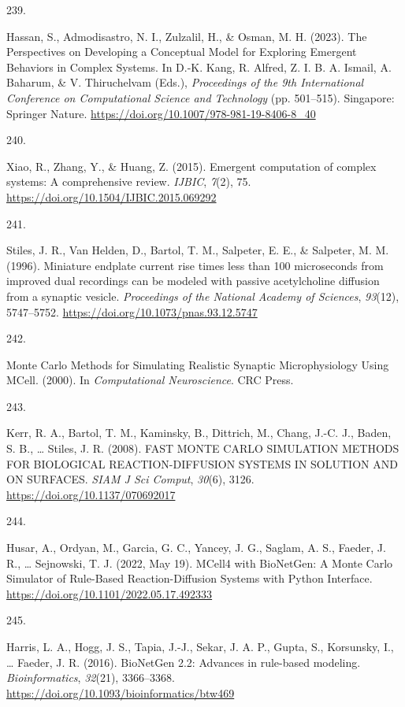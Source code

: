 \documentclass[
  11pt,
  letterpaper,
]{scrreprt}
\newlength{\cslhangindent}
\newlength{\csllabelwidth}
\newenvironment{CSLReferences}[2] %
 {\begin{list}{}{%
  \setlength{\itemindent}{0pt}
  \setlength{\leftmargin}{0pt}
  \setlength{\parsep}{0pt}
  \ifodd #1
   \setlength{\leftmargin}{\cslhangindent}
   \setlength{\itemindent}{-1\cslhangindent}
  \fi
  \setlength{\itemsep}{#2\baselineskip}}}
 {\end{list}}
\newcommand{\CSLLeftMargin}[1]{\parbox[t]{\csllabelwidth}{\strut#1\strut}}
\newcommand{\CSLRightInline}[1]{\parbox[t]{\linewidth - \csllabelwidth}{\strut#1\strut}}
\begin{document}
\begin{CSLReferences}{0}{0}
\CSLLeftMargin{239. }%
\CSLRightInline{Hassan, S., Admodisastro, N. I., Zulzalil, H., \& Osman,
M. H. (2023). The {Perspectives} on {Developing} a {Conceptual Model}
for {Exploring Emergent Behaviors} in {Complex Systems}. In D.-K. Kang,
R. Alfred, Z. I. B. A. Ismail, A. Baharum, \& V. Thiruchelvam (Eds.),
\emph{Proceedings of the 9th {International Conference} on
{Computational Science} and {Technology}} (pp. 501--515). Singapore:
Springer Nature. \url{https://doi.org/10.1007/978-981-19-8406-8_40}}

\CSLLeftMargin{240. }%
\CSLRightInline{Xiao, R., Zhang, Y., \& Huang, Z. (2015). Emergent
computation of complex systems: A comprehensive review. \emph{IJBIC},
\emph{7}(2), 75. \url{https://doi.org/10.1504/IJBIC.2015.069292}}

\CSLLeftMargin{241. }%
\CSLRightInline{Stiles, J. R., Van Helden, D., Bartol, T. M., Salpeter,
E. E., \& Salpeter, M. M. (1996). Miniature endplate current rise times
less than 100 microseconds from improved dual recordings can be modeled
with passive acetylcholine diffusion from a synaptic vesicle.
\emph{Proceedings of the National Academy of Sciences}, \emph{93}(12),
5747--5752. \url{https://doi.org/10.1073/pnas.93.12.5747}}

\CSLLeftMargin{242. }%
\CSLRightInline{Monte {Carlo Methods} for {Simulating Realistic Synaptic
Microphysiology Using MCell}. (2000). In \emph{Computational
{Neuroscience}}. CRC Press.}

\CSLLeftMargin{243. }%
\CSLRightInline{Kerr, R. A., Bartol, T. M., Kaminsky, B., Dittrich, M.,
Chang, J.-C. J., Baden, S. B., \ldots{} Stiles, J. R. (2008). {FAST
MONTE CARLO SIMULATION METHODS FOR BIOLOGICAL REACTION-DIFFUSION SYSTEMS
IN SOLUTION AND ON SURFACES}. \emph{SIAM J Sci Comput}, \emph{30}(6),
3126. \url{https://doi.org/10.1137/070692017}}

\CSLLeftMargin{244. }%
\CSLRightInline{Husar, A., Ordyan, M., Garcia, G. C., Yancey, J. G.,
Saglam, A. S., Faeder, J. R., \ldots{} Sejnowski, T. J. (2022, May 19).
{MCell4} with {BioNetGen}: {A Monte Carlo Simulator} of {Rule-Based
Reaction-Diffusion Systems} with {Python Interface}.
\url{https://doi.org/10.1101/2022.05.17.492333}}

\CSLLeftMargin{245. }%
\CSLRightInline{Harris, L. A., Hogg, J. S., Tapia, J.-J., Sekar, J. A.
P., Gupta, S., Korsunsky, I., \ldots{} Faeder, J. R. (2016). {BioNetGen}
2.2: Advances in rule-based modeling. \emph{Bioinformatics},
\emph{32}(21), 3366--3368.
\url{https://doi.org/10.1093/bioinformatics/btw469}}


\end{CSLReferences}
\end{document}
